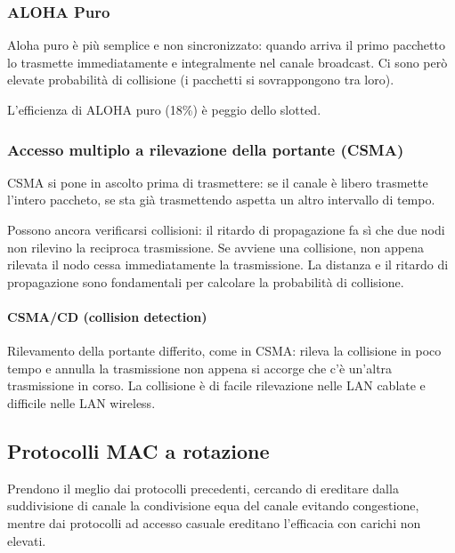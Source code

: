 \documentclass[
]{article}
\begin{document}
\hypertarget{header-n73}{%
\subsubsection{ALOHA Puro}\label{header-n73}}

Aloha puro è più semplice e non sincronizzato: quando arriva il primo
pacchetto lo trasmette immediatamente e integralmente nel canale
broadcast. Ci sono però elevate probabilità di collisione (i pacchetti
si sovrappongono tra loro).

L'efficienza di ALOHA puro (18\%) è peggio dello slotted.

\hypertarget{header-n76}{%
\subsubsection{Accesso multiplo a rilevazione della portante
(CSMA)}\label{header-n76}}

CSMA si pone in ascolto prima di trasmettere: se il canale è libero
trasmette l'intero paccheto, se sta già trasmettendo aspetta un altro
intervallo di tempo.

Possono ancora verificarsi collisioni: il ritardo di propagazione fa sì
che due nodi non rilevino la reciproca trasmissione. Se avviene una
collisione, non appena rilevata il nodo cessa immediatamente la
trasmissione. La distanza e il ritardo di propagazione sono fondamentali
per calcolare la probabilità di collisione.

\hypertarget{header-n79}{%
\paragraph{CSMA/CD (collision detection)}\label{header-n79}}

Rilevamento della portante differito, come in CSMA: rileva la collisione
in poco tempo e annulla la trasmissione non appena si accorge che c'è
un'altra trasmissione in corso. La collisione è di facile rilevazione
nelle LAN cablate e difficile nelle LAN wireless.

\hypertarget{header-n81}{%
\subsection{Protocolli MAC a rotazione}\label{header-n81}}

Prendono il meglio dai protocolli precedenti, cercando di ereditare
dalla suddivisione di canale la condivisione equa del canale evitando
congestione, mentre dai protocolli ad accesso casuale ereditano
l'efficacia con carichi non elevati.
\end{document}
